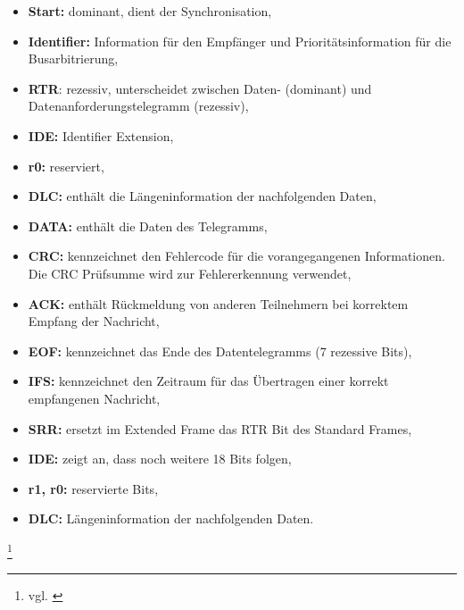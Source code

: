 \begin{itemize}
	\item \textbf{Start:} dominant, dient der Synchronisation,
	\item \textbf{Identifier:} Information für den Empfänger und Prioritätsinformation für die
	Busarbitrierung,
	\item \textbf{RTR}: rezessiv, unterscheidet zwischen Daten- (dominant) und Datenanforderungstelegramm (rezessiv),
	\item \textbf{IDE:} Identifier Extension,
	\item \textbf{r0:} reserviert,
	\item \textbf{DLC:} enthält die Längeninformation der nachfolgenden Daten,
	\item \textbf{DATA:} enthält die Daten des Telegramms,
	\item \textbf{CRC:} kennzeichnet den Fehlercode für die vorangegangenen Informationen. Die CRC
	Prüfsumme wird zur Fehlererkennung verwendet,
	\item \textbf{ACK:} enthält Rückmeldung von anderen Teilnehmern bei korrektem Empfang der
	Nachricht,
	\item \textbf{EOF:} kennzeichnet das Ende des Datentelegramms (7 rezessive Bits),
	\item \textbf{IFS:} kennzeichnet den Zeitraum für das Übertragen einer korrekt empfangenen
	Nachricht,
	\item \textbf{SRR:} ersetzt im Extended Frame das RTR Bit des Standard Frames,
	\item \textbf{IDE:} zeigt an, dass noch weitere 18 Bits folgen,
	\item \textbf{r1, r0:} reservierte Bits,
    \item \textbf{DLC:} Längeninformation der nachfolgenden Daten.
\end{itemize}

\footnote{vgl. \cite{CAN}}

\newpage


